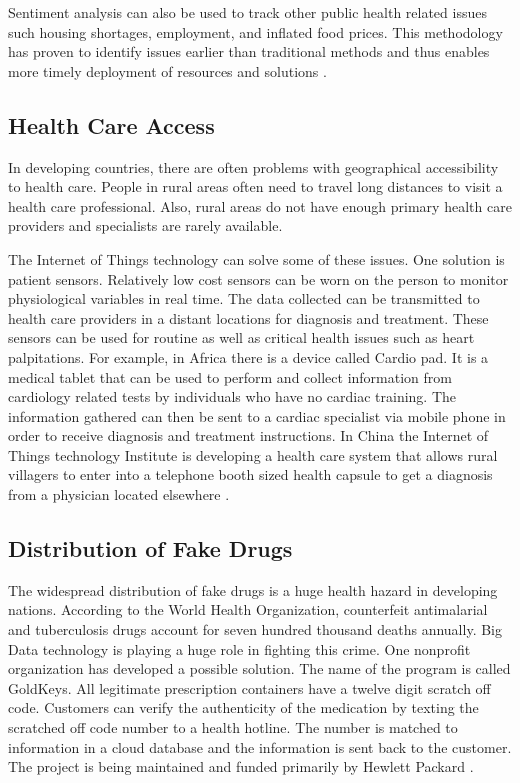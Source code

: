 \documentclass[sigconf]{acmart}
\begin{document}
Sentiment analysis can also be used to track other public health related issues such housing shortages, employment, and inflated food prices.  This methodology has proven to identify issues earlier than traditional methods and thus enables more timely deployment of resources and solutions \cite{www-google-GloPls}. 

\subsection{Health Care Access}
In developing countries, there are often problems with geographical accessibility to health care. People in rural areas often need to travel long distances to visit a health care professional. Also, rural areas do not have enough primary health care providers and specialists are rarely available. 

The Internet of Things technology can solve some of these issues. One solution is patient sensors. Relatively low cost sensors can be worn on the person to monitor physiological variables in real time.  The data collected can be transmitted to health care providers in a distant locations for diagnosis and treatment. These sensors can be used for routine as well as critical health issues such as heart palpitations. For example, in Africa there is a device called Cardio pad. It is a medical tablet that can be used to perform and collect information from cardiology related tests by individuals who have no cardiac training. The information gathered can then be sent to a cardiac specialist via mobile phone in order to receive diagnosis and treatment instructions. In China the Internet of Things technology Institute is developing a health care system that allows rural villagers to enter into a telephone booth sized health capsule to get a diagnosis from a physician located elsewhere \cite{DevEcon}. 

\subsection{Distribution of Fake Drugs}
The widespread distribution of fake drugs is a huge health hazard in developing nations. According to the World Health Organization, counterfeit antimalarial and tuberculosis drugs account for seven hundred thousand deaths annually. Big Data technology is playing a huge role in fighting this crime.  One nonprofit organization has developed a possible solution. The name of the program is called GoldKeys. All legitimate prescription containers have a twelve digit scratch off code. Customers can verify the authenticity of the medication by texting the scratched off code number to a health hotline.  The number is matched to information in a cloud database and the information is sent back to the customer. The project is being maintained and funded primarily by Hewlett Packard \cite{DevEcon}. 
\end{document}
